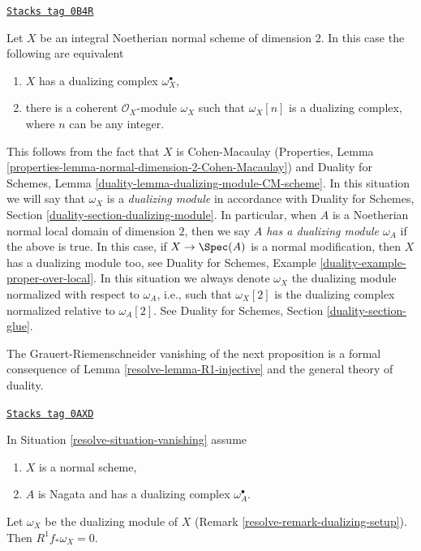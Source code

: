 \begin{remark}
\label{resolve-remark-dualizing-setup}
\href{https://stacks.math.columbia.edu/tag/0B4R}{\texttt{Stacks tag 0B4R}}

Let $X$ be an integral Noetherian normal scheme of dimension $2$.
In this case the following are equivalent
\begin{enumerate}
\item $X$ has a dualizing complex $\omega_X^\bullet$,
\item there is a coherent $\mathcal{O}_X$-module $\omega_X$ such that
$\omega_X[n]$ is a dualizing complex, where $n$ can be any integer.
\end{enumerate}
This follows from the fact that $X$ is Cohen-Macaulay
(Properties, Lemma \ref{properties-lemma-normal-dimension-2-Cohen-Macaulay}) and
Duality for Schemes, Lemma \ref{duality-lemma-dualizing-module-CM-scheme}.
In this situation we will say that $\omega_X$ is a {\it dualizing module}
in accordance with
Duality for Schemes, Section \ref{duality-section-dualizing-module}.
In particular, when $A$ is a Noetherian normal local domain of dimension
$2$, then we say {\it $A$ has a dualizing module $\omega_A$}
if the above is true. In this case, if $X \to \Spec(A)$ is a normal
modification, then $X$ has a dualizing module too, see
Duality for Schemes, Example \ref{duality-example-proper-over-local}.
In this situation we always denote $\omega_X$ the dualizing
module normalized with respect to $\omega_A$, i.e., such that
$\omega_X[2]$ is the dualizing complex normalized relative to
$\omega_A[2]$. See Duality for Schemes, Section \ref{duality-section-glue}.
\end{remark}

The Grauert-Riemenschneider vanishing of the next proposition is a formal
consequence of Lemma \ref{resolve-lemma-R1-injective} and the general theory of
duality.

\begin{proposition}

\label{resolve-proposition-Grauert-Riemenschneider}
\href{https://stacks.math.columbia.edu/tag/0AXD}{\texttt{Stacks tag 0AXD}}

In Situation \ref{resolve-situation-vanishing} assume
\begin{enumerate}
\item $X$ is a normal scheme,
\item $A$ is Nagata and has a dualizing complex $\omega_A^\bullet$.
\end{enumerate}
Let $\omega_X$ be the dualizing module of $X$
(Remark \ref{resolve-remark-dualizing-setup}). Then $R^1f_*\omega_X = 0$.
\end{proposition}

